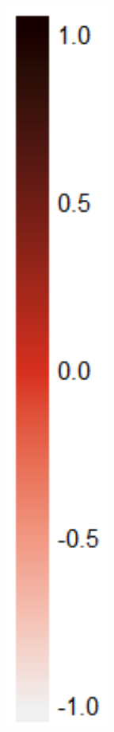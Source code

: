 \documentclass{article}
\begin{document}
\begin{figure}[t!]
\begin{subfigure}{0.3\textwidth}
	\end{subfigure}
	\begin{subfigure}{0.08\textwidth}
		\includegraphics[width=\linewidth]{figures/legend}

\end{subfigure}
\end{figure}
\end{document}
